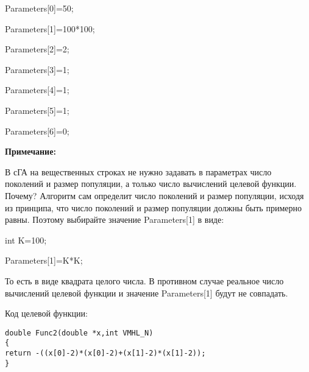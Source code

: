 \documentclass[a4paper,12pt]{article}
\begin{document}
 Parameters[0]=50;
 
Parameters[1]=100*100;

Parameters[2]=2;

Parameters[3]=1;

Parameters[4]=1;

Parameters[5]=1;

Parameters[6]=0;


\textbf{Примечание:}

 В сГА на вещественных строках не нужно задавать в параметрах число поколений и размер популяции, а только число вычислений целевой функции. Почему? Алгоритм сам определит число поколений и размер популяции, исходя из принципа, что число поколений и размер популяции должны быть примерно равны. Поэтому выбирайте значение Parameters[1] в виде:

int K=100;

Parameters[1]=K*K;

То есть в виде квадрата целого числа. В противном случае реальное число вычислений целевой функции и значение Parameters[1] будут не совпадать.

Код целевой функции:
\begin{lstlisting}[caption=Оптимизируемая функция]
double Func2(double *x,int VMHL_N)
{
return -((x[0]-2)*(x[0]-2)+(x[1]-2)*(x[1]-2));
}
\end{lstlisting}
\end{document}
